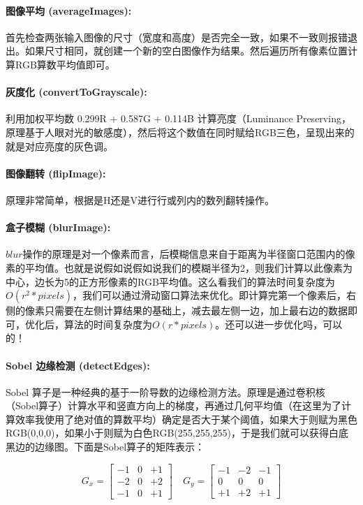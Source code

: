 \documentclass[11pt]{article}
\begin{document}
\paragraph{图像平均 (averageImages):}
首先检查两张输入图像的尺寸（宽度和高度）是否完全一致，如果不一致则报错退出。如果尺寸相同，就创建一个新的空白图像作为结果。然后遍历所有像素位置计算RGB算数平均值即可。


\paragraph{灰度化 (convertToGrayscale):}
利用加权平均数 0.299R + 0.587G + 0.114B 计算亮度（Luminance Preserving，原理基于人眼对光的敏感度），然后将这个数值在同时赋给RGB三色，呈现出来的就是对应亮度的灰色调。


\paragraph{图像翻转 (flipImage):}
原理非常简单，根据是H还是V进行行或列内的数列翻转操作。


\paragraph{盒子模糊 (blurImage):}
$blur$操作的原理是对一个像素而言，后模糊信息来自于距离为半径窗口范围内的像素的平均值。也就是说假如说假如说我们的模糊半径为2，则我们计算以此像素为中心，边长为5的正方形像素的RGB平均值。这么看我们的算法时间复杂度为$O(r^2*pixels)$，我们可以通过滑动窗口算法来优化。即计算完第一个像素后，右侧的像素只需要在左侧计算结果的基础上，减去最左侧一边，加上最右边的数据即可，优化后，算法的时间复杂度为$O(r*pixels)$。还可以进一步优化吗，可以的！

\paragraph{Sobel 边缘检测 (detectEdges):}
Sobel 算子是一种经典的基于一阶导数的边缘检测方法。原理是通过卷积核（Sobel算子）计算水平和竖直方向上的梯度，再通过几何平均值（在这里为了计算效率我使用了绝对值的算数平均）确定是否大于某个阈值，如果大于则赋为黑色RGB(0,0,0)，如果小于则赋为白色RGB(255,255,255)，于是我们就可以获得白底黑边的边缘图。下面是Sobel算子的矩阵表示：

 $$ G_x = \begin{bmatrix} -1 & 0 & +1 \\ -2 & 0 & +2 \\ -1 & 0 & +1 \end{bmatrix} \quad G_y = \begin{bmatrix} -1 & -2 & -1 \\ 0 & 0 & 0 \\ +1 & +2 & +1 \end{bmatrix} $$
\end{document}
